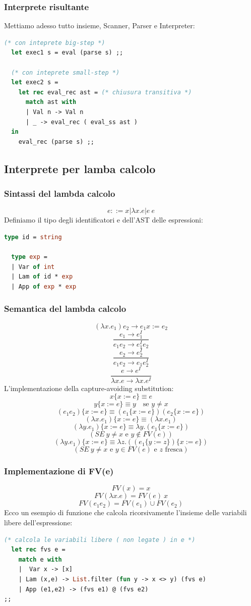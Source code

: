\documentclass[12pt,a4paper]{article}
\begin{document}
\subsubsection{Interprete risultante}
Mettiamo adesso tutto insieme, Scanner, Parser e Interpreter:
\begin{lstlisting}[language=OCaml]
  (* con inteprete big-step *)
  let exec1 s = eval (parse s) ;;

  (* con inteprete small-step *)
  let exec2 s =
    let rec eval_rec ast = (* chiusura transitiva *)
      match ast with
      | Val n -> Val n
      | _ -> eval_rec ( eval_ss ast )
  in
    eval_rec (parse s) ;;
\end{lstlisting}
\subsection{Interprete per lamba calcolo}
\subsubsection{Sintassi del lambda calcolo}
\[
e ::= x | \lambda x.e | e\ e
\]
Definiamo il tipo degli identificatori e dell'AST delle espressioni:
\begin{lstlisting}[language=OCaml]
  type id = string

  type exp =
  | Var of int
  | Lam of id * exp
  | App of exp * exp
\end{lstlisting}
\subsubsection{Semantica del lambda calcolo}
\[
(\lambda x.e_1)e_2 \rightarrow e_1{x := e_2}
\]
\[
\frac{e_1 \rightarrow e^I_1}{e_1 e_2 \rightarrow e^I_1 e_2}
\]
\[
\frac{e_2 \rightarrow e^I_2}{e_1 e_2 \rightarrow e_1 e^I_2}
\]
\[
\frac{e \rightarrow e^I}{\lambda x.e \rightarrow \lambda x.e^I}
\]
L'implementazione della capture-avoiding substitution:
\[
x\{x := e\} \equiv e
\]
\[
y\{x := e\} \equiv y \quad \text{se } y \neq x
\]
\[
(e_1e_2)\{x := e\} \equiv (e_1\{x := e\})(e_2\{x := e\})
\]
\[
(\lambda x.e_1)\{x := e\} \equiv (\lambda x.e_1)
\]
\[
(\lambda y.e_1)\{x := e\} \equiv \lambda y.(e_1\{x := e\})
\]
\[
(SE\ y \neq x \text{ e } y \notin FV(e))
\]
\[
(\lambda y.e_1)\{x := e\} \equiv \lambda z.((e_1\{y := z\})\{x := e\})
\]
\[
(SE\ y \neq x \text{ e } y \in FV(e) \text{ e } z \text{ fresca})
\]
\subsubsection{Implementazione di FV(e)}
\[
FV(x) = {x}
\]
\[
FV(\lambda x.e) = FV(e) \ {x}
\]
\[
FV(e_1 e_2) = FV(e_1) \cup FV(e_2)
\]
Ecco un esempio di funzione che calcola ricorsivamente l'insieme delle variabili libere dell'espressione:
\begin{lstlisting}[language=OCaml]
  (* calcola le variabili libere ( non legate ) in e *)
  let rec fvs e =
    match e with
    |  Var x -> [x]
    | Lam (x,e) -> List.filter (fun y -> x <> y) (fvs e)
    | App (e1,e2) -> (fvs e1) @ (fvs e2)
;;
\end{lstlisting}
\end{document}
